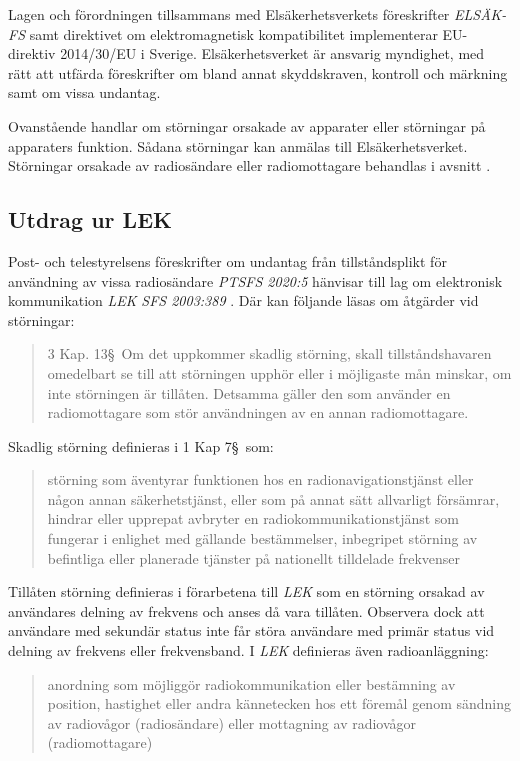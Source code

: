 Lagen och förordningen tillsammans med Elsäkerhetsverkets föreskrifter
\emph{ELSÄK-FS} samt direktivet om elektromagnetisk kompatibilitet implementerar
EU-direktiv 2014/30/EU i Sverige.
Elsäkerhetsverket är ansvarig myndighet, med rätt att utfärda föreskrifter om
bland annat skyddskraven, kontroll och märkning samt om vissa undantag.

Ovanstående handlar om störningar orsakade av apparater eller störningar på
apparaters funktion.
Sådana störningar kan anmälas till Elsäkerhetsverket.
Störningar orsakade av radiosändare eller radiomottagare behandlas i avsnitt
.


\subsection{Utdrag ur LEK}
\label{LEK}

Post- och telestyrelsens föreskrifter om undantag från tillståndsplikt för
användning av vissa radiosändare \emph{PTSFS 2020:5} \cite{PTSFS2020:5} hänvisar
till lag om elektronisk kommunikation \emph{LEK} \emph{SFS 2003:389}
\cite{SFS2003:389}.
Där kan följande läsas om åtgärder vid störningar:
\begin{quote}
	3 Kap. 13\S~Om det uppkommer skadlig störning, skall tillståndshavaren
	omedelbart se till att störningen upphör eller i möjligaste mån minskar, om
	inte störningen är tillåten.
	Detsamma gäller den som använder en radiomottagare som stör användningen av en
	annan radiomottagare.
\end{quote}
Skadlig störning definieras i 1 Kap 7\S~som:
\begin{quote}
	störning som äventyrar funktionen hos en radionavigationstjänst eller någon
	annan säkerhetstjänst, eller som på annat sätt allvarligt försämrar,
	hindrar eller upprepat avbryter en radiokommunikationstjänst som fungerar i
	enlighet med gällande bestämmelser, inbegripet störning av befintliga eller
	planerade tjänster på nationellt tilldelade frekvenser
\end{quote}
Tillåten störning definieras i förarbetena till \emph{LEK} som en störning
orsakad av användares delning av frekvens och anses då vara tillåten.
Observera dock att användare med sekundär status inte får störa användare med
primär status vid delning av frekvens eller frekvensband.
I \emph{LEK} definieras även radioanläggning:
\begin{quote}
	anordning som möjliggör radiokommunikation eller bestämning av position,
	hastighet eller andra kännetecken hos ett föremål genom sändning av radiovågor
	(radiosändare) eller mottagning av radiovågor (radiomottagare)
\end{quote}

